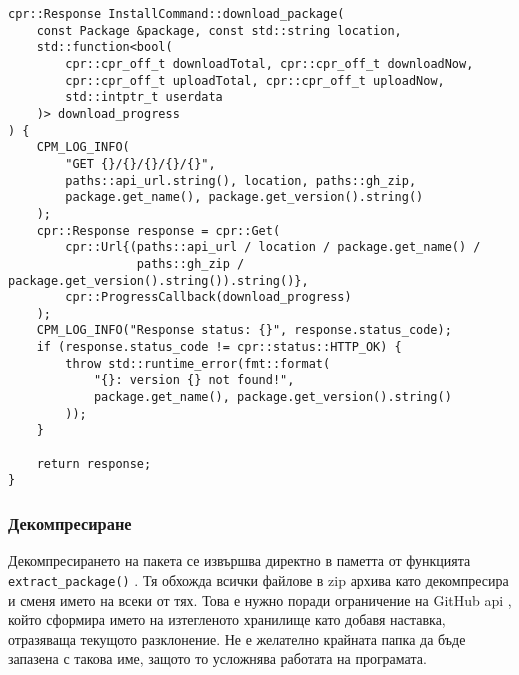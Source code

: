 \begin{lstlisting}[style=cpp,
				   caption=Функция за теглене на пакет,
				   label={lst:install-download}]
cpr::Response InstallCommand::download_package(
    const Package &package, const std::string location,
    std::function<bool(
        cpr::cpr_off_t downloadTotal, cpr::cpr_off_t downloadNow,
        cpr::cpr_off_t uploadTotal, cpr::cpr_off_t uploadNow,
        std::intptr_t userdata
    )> download_progress
) {
    CPM_LOG_INFO(
        "GET {}/{}/{}/{}/{}",
        paths::api_url.string(), location, paths::gh_zip,
        package.get_name(), package.get_version().string()
    );
    cpr::Response response = cpr::Get(
        cpr::Url{(paths::api_url / location / package.get_name() /
                  paths::gh_zip / package.get_version().string()).string()},
        cpr::ProgressCallback(download_progress)
    );
    CPM_LOG_INFO("Response status: {}", response.status_code);
    if (response.status_code != cpr::status::HTTP_OK) {
        throw std::runtime_error(fmt::format(
            "{}: version {} not found!",
            package.get_name(), package.get_version().string()
        ));
    }

    return response;
}
\end{lstlisting}


\subsubsection{Декомпресиране}

Декомпресирането на пакета се извършва директно в паметта от функцията
\texttt{extract\_package()} . Тя обхожда всички
файлове в zip архива като декомпресира и сменя името на всеки от тях. Това е
нужно поради ограничение на GitHub \acrshort{api} \cite{contents_zip}, който
сформира името на изтегленото хранилище като добавя наставка, отразяваща
текущото разклонение. Не е желателно крайната папка да бъде запазена с такова
име, защото то усложнява работата на програмата.


